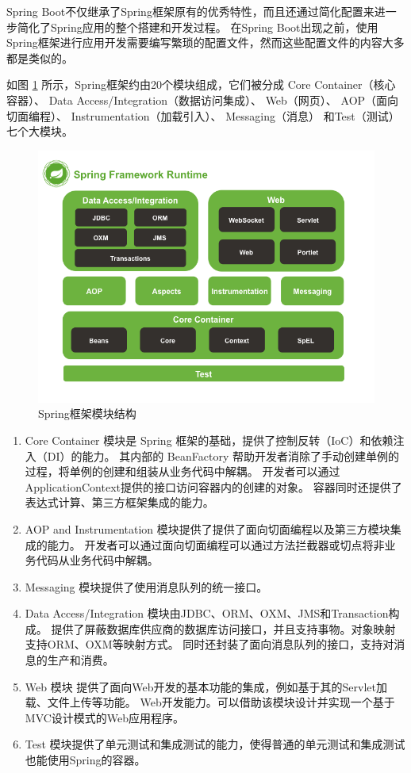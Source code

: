 Spring Boot不仅继承了Spring框架原有的优秀特性，而且还通过简化配置来进一步简化了Spring应用的整个搭建和开发过程。
在Spring Boot出现之前，使用Spring框架进行应用开发需要编写繁琐的配置文件，然而这些配置文件的内容大多都是类似的。

如图 \ref{Fig:spring} 所示，Spring框架约由20个模块组成，它们被分成
Core Container（核心容器）、
Data Access/Integration（数据访问集成）、
Web（网页）、
AOP（面向切面编程）、
Instrumentation（加载引入）、
Messaging（消息）
和Test（测试）七个大模块。

\begin{figure}[ht]
    \centering
    \includegraphics[scale=.4]{./Figure/IMG_spring.png}
    \caption{Spring框架模块结构}
    \label{Fig:spring}
\end{figure}

\begin{enumerate}
    \item Core Container 模块是 Spring 框架的基础，提供了控制反转（IoC）和依赖注入（DI）的能力。
    其内部的 BeanFactory 帮助开发者消除了手动创建单例的过程，将单例的创建和组装从业务代码中解耦。
    开发者可以通过ApplicationContext提供的接口访问容器内的创建的对象。
    容器同时还提供了表达式计算、第三方框架集成的能力。
    \item AOP and Instrumentation 模块提供了提供了面向切面编程以及第三方模块集成的能力。
    开发者可以通过面向切面编程可以通过方法拦截器或切点将非业务代码从业务代码中解耦。
    \item Messaging 模块提供了使用消息队列的统一接口。
    \item Data Access/Integration 模块由JDBC、ORM、OXM、JMS和Transaction构成。
    提供了屏蔽数据库供应商的数据库访问接口，并且支持事物。对象映射支持ORM、OXM等映射方式。
    同时还封装了面向消息队列的接口，支持对消息的生产和消费。
    \item Web 模块 提供了面向Web开发的基本功能的集成，例如基于其的Servlet加载、文件上传等功能。
    Web开发能力。可以借助该模块设计并实现一个基于MVC设计模式的Web应用程序。
    \item Test 模块提供了单元测试和集成测试的能力，使得普通的单元测试和集成测试也能使用Spring的容器。
\end{enumerate}

